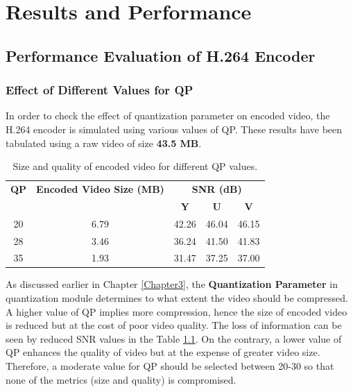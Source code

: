 
\chapter{Results and Performance} %
\label{Chapter5}


\section{Performance Evaluation of H.264 Encoder}

\subsection{Effect of Different Values for QP}
In order to check the effect of quantization parameter on encoded video, the H.264 encoder is simulated using various values of QP. These results have been tabulated using a raw video of size \textbf{43.5 MB}.
\begin{table}[H]
	\centering
	\begin{tabular}{|c|c|c|c|c|} \hline
		\textbf{QP}  & \textbf{Encoded Video Size (MB)} & \multicolumn{3}{|c|}{\textbf{SNR (dB)}}  \\
		\cline{3-5}
		    &                    &  \textbf{Y} & \textbf{U} & \textbf{V}\\ \hline
		20  &    6.79            & 42.26   & 46.04  & 46.15  \\ \hline
		28  &    3.46            & 36.24   & 41.50  & 41.83  \\ \hline
		35  &    1.93            & 31.47   & 37.25  & 37.00  \\ \hline
	\end{tabular}
	\caption{Size and quality of encoded video for different QP values.}
	\label{tab:qp}
\end{table}
As discussed earlier in Chapter \ref{Chapter3}, the \textbf{Quantization Parameter} in quantization module determines to what extent the video should be compressed. A higher value of QP implies more compression, hence the size of encoded video is reduced but at the cost of poor video quality. The loss of information can be seen by reduced SNR values in the Table \ref{tab:qp}. On the contrary, a lower value of QP enhances the quality of video but at the expense of greater video size. Therefore, a moderate value for QP should be selected between 20-30 so that none of the metrics (size and quality) is compromised. 


